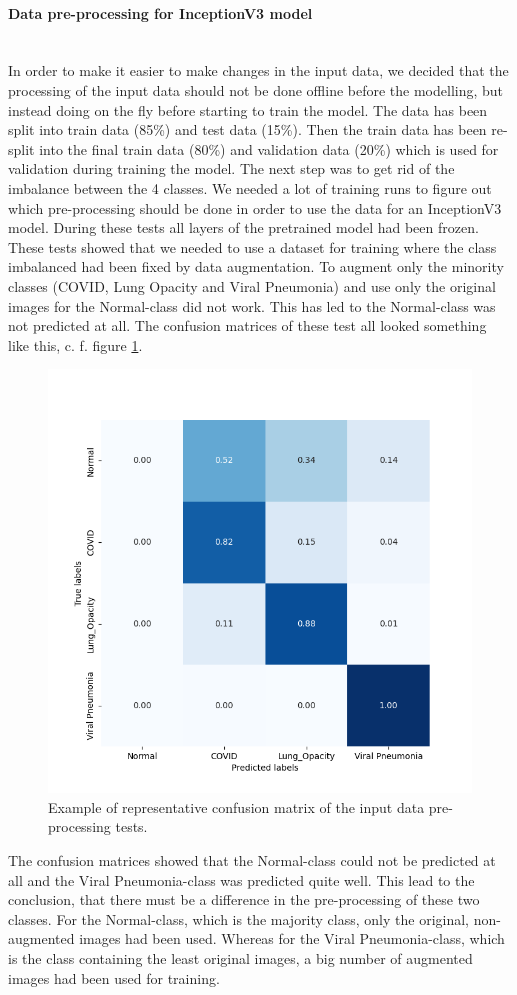 \documentclass{article}
\begin{document}
\paragraph{Data pre-processing for InceptionV3 model}\mbox{}\\
In order to make it easier to make changes in the input data, we decided that the processing of the input data should not be done offline before the modelling, but instead doing on the fly before starting to train the model. 
The data has been split into train data (85\%) and test data (15\%). Then the train data has been re-split into the final train data (80\%) and validation data (20\%) which is used for validation during training the model. 
The next step was to get rid of the imbalance between the 4 classes. We needed a lot of training runs to figure out which pre-processing should be done in order to use the data for an InceptionV3 model. During these tests all layers of the pretrained model had been frozen. 
These tests showed that we needed to use a dataset for training where the class imbalanced had been fixed by data augmentation. To augment only the minority classes (COVID, Lung Opacity and Viral Pneumonia) and use only the original images for the Normal-class did not work. This has led to the Normal-class was not predicted at all. The confusion matrices of these test all looked something like this, c. f. figure \ref{fig:vgg16_yb_03_cm_norm.png}.
\begin{figure}%
    \centering
    \includegraphics[width=0.5\linewidth]{vgg16_yb_03_cm_norm.png}
    \caption{Example of representative confusion matrix of the input data pre-processing tests.}
    \label{fig:vgg16_yb_03_cm_norm.png}
\end{figure}
The confusion matrices showed that the Normal-class could not be predicted at all and the Viral Pneumonia-class was predicted quite well. This lead to the conclusion, that there must be a difference in the pre-processing of these two classes. For the Normal-class, which is the majority class, only the original, non-augmented images had been used. Whereas for the Viral Pneumonia-class, which is the class containing the least original images, a big number of augmented images had been used for training. 
\end{document}
